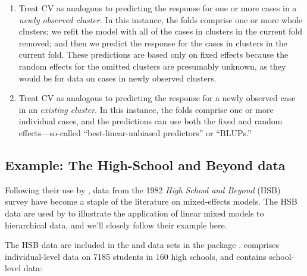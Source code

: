 \documentclass[
]{jss}
\begin{document}
\begin{enumerate}
\def\labelenumi{\arabic{enumi}.}
\item
  Treat CV as analogous to predicting the response for one or more cases
  in a \emph{newly observed cluster}. In this instance, the folds
  comprise one or more whole clusters; we refit the model with all of
  the cases in clusters in the current fold removed; and then we predict
  the response for the cases in clusters in the current fold. These
  predictions are based only on fixed effects because the random effects
  for the omitted clusters are presumably unknown, as they would be for
  data on cases in newly observed clusters.
\item
  Treat CV as analogous to predicting the response for a newly observed
  case in an \emph{existing cluster}. In this instance, the folds
  comprise one or more individual cases, and the predictions can use
  both the fixed and random effects---so-called ``best-linear-unbiased
  predictors'' or ``BLUPs.''
\end{enumerate}

\hypertarget{example-the-high-school-and-beyond-data}{%
\subsection{Example: The High-School and Beyond
data}\label{example-the-high-school-and-beyond-data}}

Following their use by \citet{RaudenbushBryk:2002}, data from the 1982
\emph{High School and Beyond} (HSB) survey have become a staple of the
literature on mixed-effects models. The HSB data are used by \citet[Sec.
7.2.2]{FoxWeisberg:2019} to illustrate the application of linear mixed
models to hierarchical data, and we'll closely follow their example
here.

The HSB data are included in the  and
 data sets in the  package
\citep{PinheiroBates:2000}.  comprises
individual-level data on 7185 students in 160 high schools, and
 contains school-level data:
\end{document}
